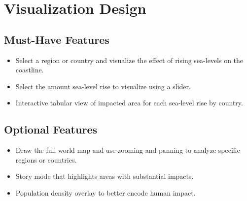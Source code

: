 \documentclass[12pt]{article}
\begin{document}
	\section{Visualization Design}
		\subsection{Must-Have Features}
			\begin{itemize}
				\item
					Select a region or country and visualize the effect of rising sea-levels on the coastline.

				\item
					Select the amount sea-level rise to visualize using a slider.

				\item
					Interactive tabular view of impacted area for each sea-level rise by country.
			\end{itemize}

		\subsection{Optional Features}
			\begin{itemize}
				\item
					Draw the full world map and use zooming and panning to analyze specific regions or countries.

				\item
					Story mode that highlights areas with substantial impacts.

				\item
					Population density overlay to better encode human impact.
			\end{itemize}
\end{document}
